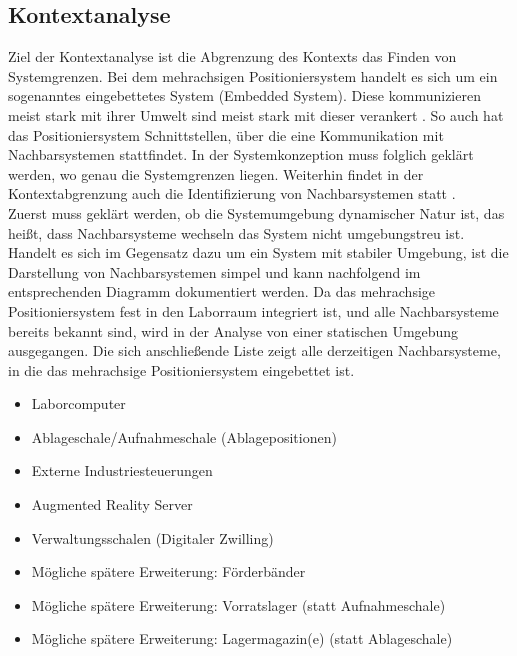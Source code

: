 \documentclass[../../../Bachelorarbeit.tex]{subfiles}
\begin{document}
\subsection{Kontextanalyse} \label{kontextana}
Ziel der Kontextanalyse ist die Abgrenzung des Kontexts \bzw das Finden von Systemgrenzen. Bei dem mehrachsigen Positioniersystem handelt es sich um ein sogenanntes eingebettetes System (\eng Embedded System). Diese kommunizieren meist stark mit ihrer Umwelt \bzw sind meist stark mit dieser verankert \cite[2]{Marwedel2007}.
So auch hat das Positioniersystem Schnittstellen, über die eine Kommunikation mit Nachbarsystemen stattfindet. In der Systemkonzeption muss folglich geklärt werden, wo genau die Systemgrenzen liegen. Weiterhin findet in der Kontextabgrenzung auch die Identifizierung von Nachbarsystemen statt \cite[49]{Walke2005}.\\
Zuerst muss geklärt werden, ob die Systemumgebung dynamischer Natur ist, das heißt, dass Nachbarsysteme wechseln \bzw das System nicht umgebungstreu ist. Handelt es sich im Gegensatz dazu um ein System mit stabiler Umgebung, ist die Darstellung von Nachbarsystemen simpel und kann nachfolgend im entsprechenden Diagramm dokumentiert werden. Da das mehrachsige Positioniersystem fest in den Laborraum integriert ist, und alle Nachbarsysteme bereits bekannt sind, wird in der Analyse von einer statischen Umgebung ausgegangen. Die sich anschließende Liste zeigt alle derzeitigen Nachbarsysteme, in die das mehrachsige Positioniersystem eingebettet ist.\\

\begin{itemize}
    \item Laborcomputer
    \item Ablageschale/Aufnahmeschale (Ablagepositionen)
    \item Externe Industriesteuerungen
    \item Augmented Reality Server
    \item Verwaltungsschalen (Digitaler Zwilling)
    \item Mögliche spätere Erweiterung: Förderbänder
    \item Mögliche spätere Erweiterung: Vorratslager (statt Aufnahmeschale)
    \item Mögliche spätere Erweiterung: Lagermagazin(e) (statt Ablageschale)
\end{itemize}
\end{document}
